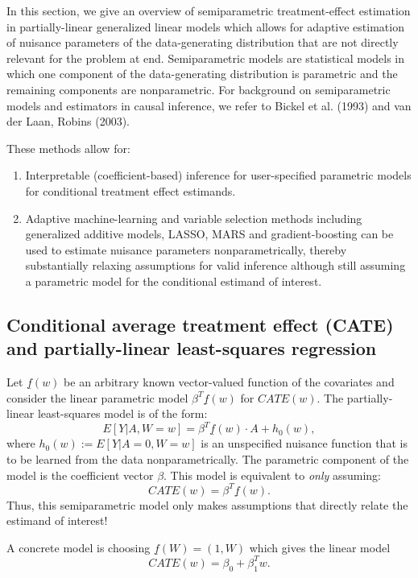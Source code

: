 \documentclass{article}
\begin{document}
In this section, we give an overview of semiparametric treatment-effect estimation in partially-linear generalized linear models which allows for adaptive estimation of nuisance parameters of the data-generating distribution that are not directly relevant for the problem at end. Semiparametric models are statistical models in which one component of the data-generating distribution is parametric and the remaining components are nonparametric. For background on semiparametric models and estimators in causal inference, we refer to Bickel et al. (1993) and van der Laan, Robins (2003).\nocite{vanderlaanunified}\nocite{bickel1993efficient}



These methods allow for:
\begin{enumerate}
\item Interpretable (coefficient-based) inference for user-specified parametric models for conditional treatment effect estimands.
\item Adaptive machine-learning and variable selection methods including generalized additive models, LASSO, MARS and gradient-boosting can be used to estimate nuisance parameters nonparametrically, thereby substantially relaxing assumptions for valid inference although still assuming a parametric model for the conditional estimand of interest.
\end{enumerate}

\subsection{Conditional average treatment effect (CATE) and partially-linear least-squares regression}
Let $\underline{f}(w)$ be an arbitrary known vector-valued function of the covariates and consider the linear parametric model $\beta^T \underline{f}(w)$ for $CATE(w)$. The partially-linear least-squares model is of the form:
$$E[Y|A,W=w] = \beta^T \underline{f}(w) \cdot A + h_0(w),$$
where $ h_0(w) := E[Y|A=0,W=w]$ is an unspecified nuisance function that is to be learned from the data nonparametrically. The parametric component of the model is the coefficient vector $\beta$. This model is equivalent to \textit{only} assuming:
$$CATE(w) = \beta^T \underline{f}(w).$$
Thus, this semiparametric model only makes assumptions that directly relate the estimand of interest! 

\noindent A concrete model is choosing $\underline{f}(W) = (1,W)$ which gives the linear model
$$CATE(w) = \beta_0 + \beta_1^T w.$$
\end{document}
